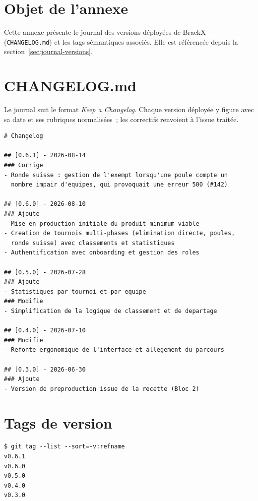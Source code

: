 \label{chap:annexe-versions}
\section*{Objet de l'annexe}
Cette annexe présente le journal des versions déployées de BrackX (\texttt{CHANGELOG.md}) et les tags sémantiques associés. Elle est référencée depuis la section~\ref*{sec:journal-versions}.

\section*{CHANGELOG.md}
Le journal suit le format \emph{Keep a Changelog}. Chaque version déployée y figure avec sa date et ses rubriques normalisées~; les correctifs renvoient à l'issue traitée.

\begin{lstlisting}
# Changelog

## [0.6.1] - 2026-08-14
### Corrige
- Ronde suisse : gestion de l'exempt lorsqu'une poule compte un
  nombre impair d'equipes, qui provoquait une erreur 500 (#142)

## [0.6.0] - 2026-08-10
### Ajoute
- Mise en production initiale du produit minimum viable
- Creation de tournois multi-phases (elimination directe, poules,
  ronde suisse) avec classements et statistiques
- Authentification avec onboarding et gestion des roles

## [0.5.0] - 2026-07-28
### Ajoute
- Statistiques par tournoi et par equipe
### Modifie
- Simplification de la logique de classement et de departage

## [0.4.0] - 2026-07-10
### Modifie
- Refonte ergonomique de l'interface et allegement du parcours

## [0.3.0] - 2026-06-30
### Ajoute
- Version de preproduction issue de la recette (Bloc 2)
\end{lstlisting}

\section*{Tags de version}
\begin{lstlisting}
$ git tag --list --sort=-v:refname
v0.6.1
v0.6.0
v0.5.0
v0.4.0
v0.3.0
\end{lstlisting}

